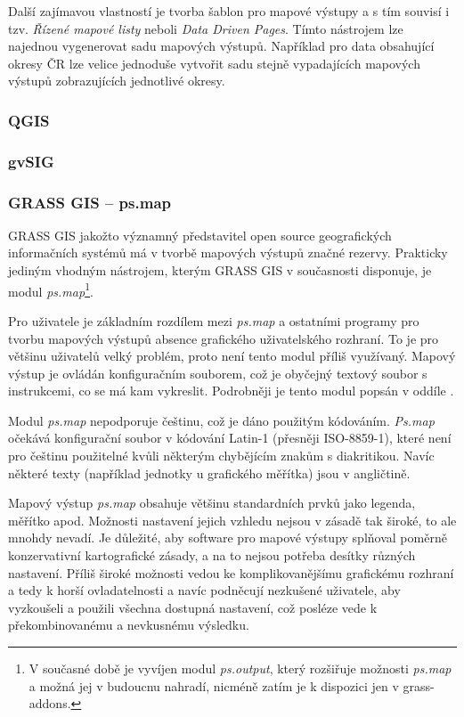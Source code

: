 \documentclass[a4paper,12pt,draft]{article}
\newcommand{\modul}[1]{\emph{#1}}
\begin{document}
Další zajímavou vlastností je tvorba šablon pro mapové výstupy a s tím souvisí i tzv. \emph{Řízené mapové listy} neboli \emph{Data Driven Pages}. Tímto nástrojem lze najednou vygenerovat sadu mapových výstupů. Například pro data obsahující okresy ČR lze velice jednoduše vytvořit sadu stejně vypadajících mapových výstupů zobrazujících jednotlivé okresy.





\subsubsection{QGIS}

\subsubsection{gvSIG}

\subsubsection{GRASS GIS -- ps.map}
\label{sec:porovnani:psmap}
GRASS GIS jakožto významný představitel open source geografických informačních systémů má v tvorbě mapových výstupů značné rezervy. Prakticky jediným vhodným nástrojem, kterým GRASS GIS v současnosti disponuje, je modul \modul{ps.map}\footnote{V současné době je vyvíjen modul \modul{ps.output}, který rozšiřuje možnosti \modul{ps.map} a možná jej v budoucnu nahradí, nicméně zatím je k dispozici jen v grass-addons.}.

Pro uživatele je základním rozdílem mezi \modul{ps.map} a ostatními programy pro tvorbu mapových výstupů  absence grafického uživatelského rozhraní. To je pro většinu uživatelů velký problém, proto není tento modul příliš využívaný. Mapový výstup je ovládán konfiguračním souborem, což je obyčejný textový soubor s instrukcemi, co se má kam vykreslit. Podrobněji je tento modul popsán v oddíle .

Modul \modul{ps.map} nepodporuje češtinu, což je dáno použitým kódováním. \modul{Ps.map} očekává konfigurační soubor v kódování Latin-1 (přesněji ISO-8859-1), které není pro češtinu použitelné kvůli některým chybějícím znakům s diakritikou. Navíc některé texty (například jednotky u grafického měřítka) jsou v angličtině.

Mapový výstup \modul{ps.map} obsahuje většinu standardních prvků jako legenda, měřítko apod. Možnosti nastavení jejich vzhledu nejsou v zásadě tak široké, to ale mnohdy nevadí. Je důležité, aby software pro mapové výstupy splňoval poměrně konzervativní kartografické zásady, a na to nejsou potřeba desítky různých nastavení. Příliš široké možnosti vedou ke komplikovanějšímu grafickému rozhraní a tedy k horší ovladatelnosti a navíc podněcují nezkušené uživatele, aby vyzkoušeli a použili všechna dostupná nastavení, což posléze vede k překombinovanému a nevkusnému výsledku. 
\end{document}
